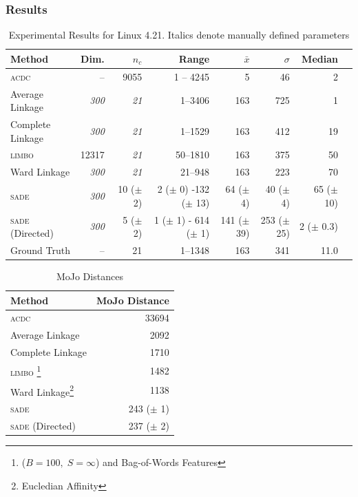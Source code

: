 \documentclass{beamer}
\begin{document}
\begin{frame}[allowframebreaks]
    \frametitle{Results}
    \tiny
    \begin{table}
    
    \begin{tabular}{lrrrrrrr}
    \hline
    Method & Dim.  & $n_c$ & Range & $\bar x$ & $\sigma$ & Median  \\
    \hline
    \textsc{acdc}  & -- & 9055 & 1 -- 4245 & 5 & 46 & 2 \\
    Average Linkage  & \emph{300} & \emph{21} & 1--3406 & 163 & 725 & 1 \\
    Complete Linkage  & \emph{300} & \emph{21} & 1--1529 & 163 & 412 & 19 \\
    \textsc{limbo}   & 12317 &\emph{21} & 50--1810 & 163 & 375 & 50 \\

    Ward Linkage & \emph{300} & \emph{21} & 21--948 & 163 & 223 & 70 \\
        
    \textsc{sade} & \emph{300} & 10 ($\pm$ 2)  & 2 ($\pm$ 0) -132 ($\pm$ 13) & 64 ($\pm$ 4) & 40 ($\pm$ 4) & 65 ($\pm$ 10)   \\
    \textsc{sade} (Directed) & \emph{300} & 5 ($\pm$ 2) & 1 ($\pm$ 1) - 614 ($\pm$ 1) & 141 ($\pm$ 39) & 253 ($\pm$ 25) & 2 ($\pm$ 0.3)   \\
    \hline
    Ground Truth & -- & 21 & 1--1348 & 163 & 341 & 11.0 \\
    \hline
  \end{tabular}
   \caption{Experimental Results for Linux 4.21. Italics denote manually defined parameters}

\end{table}
   
  \begin{table}
  \framebreak
  \small
  \begin{tabular}{lr}
    \hline
    Method &   MoJo Distance \\
    \hline
    \textsc{acdc}  &  33694\\
    Average Linkage  & 2092 \\
    Complete Linkage  &  1710 \\
    \textsc{limbo}  \footnote{($B=100, \; S = \infty$) and Bag-of-Words Features} &  1482 \\

    Ward Linkage\footnote{Eucledian Affinity} &  1138 \\
        
    \textsc{sade} &  243 ($\pm$ 1)  \\
    \textsc{sade} (Directed) &  237 ($\pm$ 2) \\ \hline  
    
    \end{tabular}
    \caption{MoJo Distances}

\end{table}
    
\end{frame}
 
\end{document}
